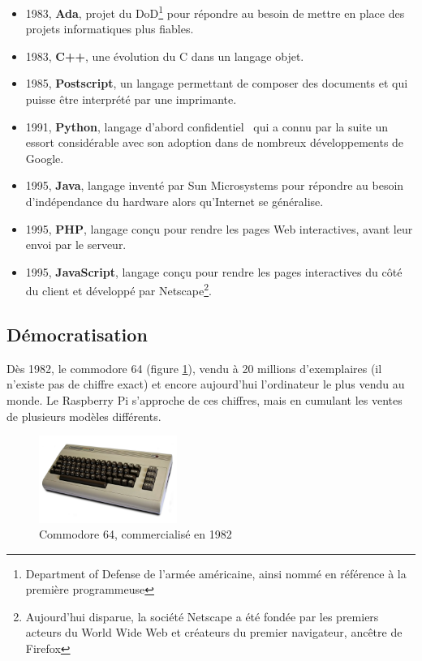 \documentclass[a4paper,11pt]{book}
\begin{document}
\begin{itemize}
    \item 1983, \textbf{Ada}, projet du DoD\footnote{Department of Defense de l'armée américaine, ainsi nommé en référence à la première programmeuse} pour répondre au besoin de mettre en place des projets informatiques plus fiables.
    \item 1983, \textbf{C++}, une évolution du C dans un langage objet.
    \item 1985, \textbf{Postscript}, un langage permettant de composer des documents et qui puisse être interprété par une imprimante.
    \item 1991, \textbf{Python}, langage d'abord \guillemotleft confidentiel\guillemotright~ qui a connu par la suite un essort considérable avec son adoption dans de nombreux développements de Google.
    \item 1995, \textbf{Java}, langage inventé par Sun Microsystems pour répondre au besoin d'indépendance du hardware alors qu'Internet se généralise.
    \item 1995, \textbf{PHP}, langage conçu pour rendre les pages Web interactives, avant leur envoi par le serveur.
    \item 1995, \textbf{JavaScript}, langage conçu pour rendre les pages interactives du côté du client et développé par Netscape\footnote{Aujourd'hui disparue, la société Netscape a été fondée par les premiers acteurs du World Wide Web et créateurs du premier navigateur, ancêtre de Firefox}.
\end{itemize}

\subsection{Démocratisation}
Dès 1982, le commodore 64 (figure \ref{commodore64}), vendu à 20 millions d'exemplaires (il n'existe pas de chiffre exact) et encore aujourd'hui l'ordinateur le plus vendu au monde. Le Raspberry Pi s'approche de ces chiffres, mais en cumulant les ventes de plusieurs modèles différents.

\begin{figure}[h]
    \centering
    \includegraphics[width=0.4\textwidth]{media/machines/Commodore64.jpeg}
    \caption{Commodore 64, commercialisé en 1982}
    \label{commodore64}
\end{figure}
\end{document}
